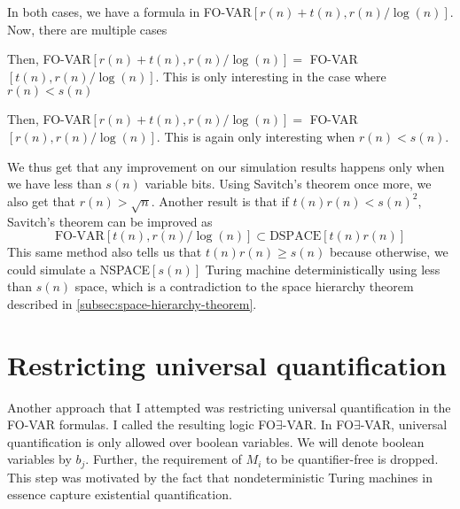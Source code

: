 In both cases, we have a formula in FO-VAR$[r(n) + t(n), r(n)/\log(n)]$.
Now, there are multiple cases
\begin{description}
    \setlength\itemsep{0.2em}
    \item[$r(n) \leq t(n)$:]  Then, FO-VAR$[r(n) + t(n), r(n)/\log(n)] =$ FO-VAR$[t(n), r(n)/\log(n)]$.
    This is only interesting in the case where $r(n) < s(n)$
    \item[$r(n) > t(n)$:] Then, FO-VAR$[r(n) + t(n), r(n)/\log(n)] =$ FO-VAR$[r(n), r(n)/\log(n)]$.
    This is again only interesting when $r(n) < s(n)$.
\end{description}

We thus get that any improvement on our simulation results happens only when we have less than $s(n)$ variable bits.
Using Savitch's theorem once more, we also get that $r(n) > \sqrt{n}$.
Another result is that if $t(n)r(n) < s(n)^2$, Savitch's theorem can be improved as
\[
    \text{FO-VAR}[t(n), r(n)/\log(n)] \subset \text{DSPACE}[t(n)r(n)]
\]
This same method also tells us that $t(n)r(n) \geq s(n)$ because otherwise, we could simulate a NSPACE$[s(n)]$ Turing machine deterministically using less than $s(n)$ space, which is a contradiction to the space hierarchy theorem described in \cref{subsec:space-hierarchy-theorem}.


\section{Restricting universal quantification}\label{sec:restricting-universal-quantification}

Another approach that I attempted was restricting universal quantification in the FO-VAR formulas.
I called the resulting logic FO$\exists$-VAR\@.
In FO$\exists$-VAR, universal quantification is only allowed over boolean variables.
We will denote boolean variables by $b_j$.
Further, the requirement of $M_i$ to be quantifier-free is dropped.
This step was motivated by the fact that nondeterministic Turing machines in essence capture existential quantification.

